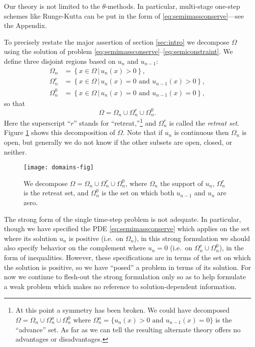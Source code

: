 \documentclass[final,leqno,onefignum,onetabnum]{siamltex1213bueler}
\begin{document}
Our theory is not limited to the $\theta$-methods.  In particular, multi-stage one-step schemes like Runge-Kutta can be put in the form of \eqref{eq:semimassconserve}---see the Appendix.

To precisely restate the major assertion of section \ref{sec:intro} we decompose $\Omega$ using the solution of problem \eqref{eq:semimassconserve}--\eqref{eq:semiconstraint}.   We define three disjoint regions based on $u_n$ and $u_{n-1}$:
\begin{align*}
\Omega_n &= \left\{x \in \Omega \,\big|\, u_n(x)>0\right\}, \\
\Omega_n^r &= \left\{x \in \Omega \,\big|\, u_n(x)=0 \text{ and } u_{n-1}(x) > 0\right\}, \\
\Omega_n^0 &= \left\{x \in \Omega \,\big|\, u_n(x)=0 \text{ and } u_{n-1}(x) = 0\right\},
\end{align*}
so that
\begin{equation}
\Omega = \Omega_n \cup \Omega_n^r \cup \Omega_n^0.  \label{eq:omegadecomposition}
\end{equation}
Here the superscript ``$r$'' stands for ``retreat,''\footnote{At this point a symmetry has been broken.  We could have decomposed $\Omega= \Omega_n \cup \Omega_n^a \cup \Omega_n^0$ where $\Omega_n^a = \{u_n(x) > 0 \text{ and } u_{n-1}(x) = 0\}$ is the ``advance'' set.  As far as we can tell the resulting alternate theory offers no advantages or disadvantages.} and $\Omega_n^r$ is called the \emph{retreat set}.  Figure \ref{fig:domains} shows this decomposition of $\Omega$.  Note that if $u_n$ is continuous then $\Omega_n$ is open, but generally we do not know if the other subsets are open, closed, or neither.

\begin{figure}[ht]
\begin{center}
\texttt{[image: domains-fig]}
\end{center}
\caption{We decompose $\Omega = \Omega_n \cup \Omega_n^r \cup \Omega_n^0$, where $\Omega_n$ the support of $u_n$, $\Omega_n^r$ is the retreat set, and $\Omega_n^0$ is the set on which both $u_{n-1}$ and $u_n$ are zero.}
\label{fig:domains}
\end{figure}

The strong form of the single time-step problem is not adequate.  In particular, though we have specified the PDE \eqref{eq:semimassconserve} which applies on the set where its solution $u_n$ is positive (i.e.~on $\Omega_n$), in this strong formulation we should also specify behavior on the complement where $u_n=0$ (i.e.~on $\Omega_n^r \cup \Omega_n^0$), in the form of inequalities.  However, these specifications are in terms of the set on which the solution is positive, so we have ``posed'' a problem in terms of its solution.  For now we continue to flesh-out the strong formulation only so as to help formulate a weak problem which makes no reference to solution-dependent information.
\end{document}
